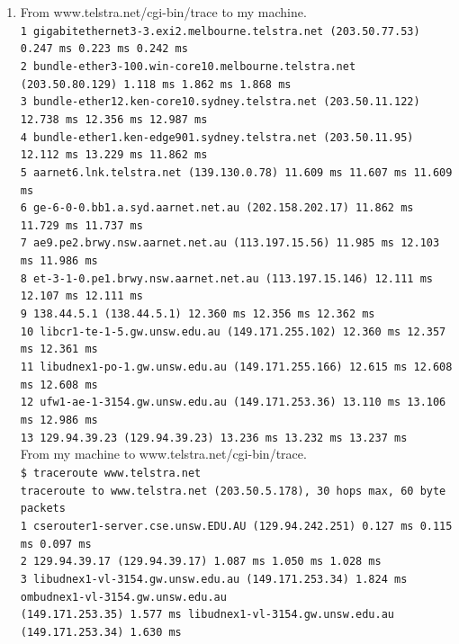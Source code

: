 \documentclass[a4paper,11pt]{article}
\newcommand{\code}{\texttt}
\begin{document}
\begin{enumerate}[leftmargin=*]
\begin{enumerate}
		\pagebreak

		\item From www.telstra.net/cgi-bin/trace to my machine.\\
			\code{\scriptsize 1  gigabitethernet3-3.exi2.melbourne.telstra.net (203.50.77.53)  0.247 ms  0.223 ms  0.242 ms\\
 2  bundle-ether3-100.win-core10.melbourne.telstra.net (203.50.80.129)  1.118 ms  1.862 ms  1.868 ms\\
 3  bundle-ether12.ken-core10.sydney.telstra.net (203.50.11.122)  12.738 ms  12.356 ms  12.987 ms\\
 4  bundle-ether1.ken-edge901.sydney.telstra.net (203.50.11.95)  12.112 ms  13.229 ms  11.862 ms\\
 5  aarnet6.lnk.telstra.net (139.130.0.78)  11.609 ms  11.607 ms  11.609 ms\\
 6  ge-6-0-0.bb1.a.syd.aarnet.net.au (202.158.202.17)  11.862 ms  11.729 ms  11.737 ms\\
 7  ae9.pe2.brwy.nsw.aarnet.net.au (113.197.15.56)  11.985 ms  12.103 ms  11.986 ms\\
 8  et-3-1-0.pe1.brwy.nsw.aarnet.net.au (113.197.15.146)  12.111 ms  12.107 ms  12.111 ms\\
 9  138.44.5.1 (138.44.5.1)  12.360 ms  12.356 ms  12.362 ms\\
10  libcr1-te-1-5.gw.unsw.edu.au (149.171.255.102)  12.360 ms  12.357 ms  12.361 ms\\
11  libudnex1-po-1.gw.unsw.edu.au (149.171.255.166)  12.615 ms  12.608 ms  12.608 ms\\
12  ufw1-ae-1-3154.gw.unsw.edu.au (149.171.253.36)  13.110 ms  13.106 ms  12.986 ms\\
13  129.94.39.23 (129.94.39.23)  13.236 ms  13.232 ms  13.237 ms\\}
			\break
			From my machine to www.telstra.net/cgi-bin/trace.\\
			\code{\scriptsize \$ traceroute www.telstra.net\\
			traceroute to www.telstra.net (203.50.5.178), 30 hops max, 60 byte packets\\
			 1  cserouter1-server.cse.unsw.EDU.AU (129.94.242.251)  0.127 ms  0.115 ms  0.097 ms\\
			 2  129.94.39.17 (129.94.39.17)  1.087 ms  1.050 ms  1.028 ms\\
			 3  libudnex1-vl-3154.gw.unsw.edu.au (149.171.253.34)  1.824 ms ombudnex1-vl-3154.gw.unsw.edu.au\\
			 (149.171.253.35)  1.577 ms libudnex1-vl-3154.gw.unsw.edu.au (149.171.253.34)  1.630 ms\\
}
\end{enumerate}
\end{enumerate}
\end{document}
